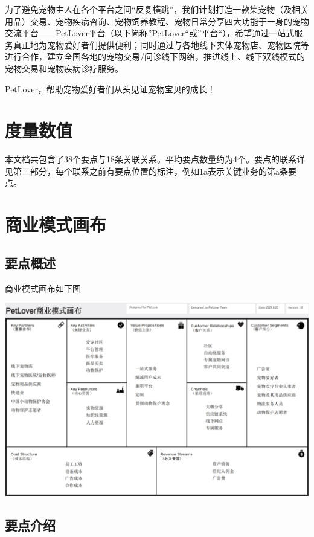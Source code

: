 \documentclass[a4paper]{ctexart}
\begin{document}
为了避免宠物主人在各个平台之间“反复横跳”，我们计划打造一款集宠物（及相关用品）交易、宠物疾病咨询、宠物饲养教程、宠物日常分享四大功能于一身的宠物交流平台——PetLover平台（以下简称”PetLover“或”平台“），希望通过一站式服务真正地为宠物爱好者们提供便利；同时通过与各地线下实体宠物店、宠物医院等进行合作，建立全国各地的宠物交易/问诊线下网络，推进线上、线下双线模式的宠物交易和宠物疾病诊疗服务。

PetLover，帮助宠物爱好者们从头见证宠物宝贝的成长！


\section{度量数值}

本文档共包含了38个要点与18条关联关系。平均要点数量约为4个。要点的联系详见第三部分，每个联系之前有要点位置的标注，例如1a表示关键业务的第a条要点。

\section{商业模式画布}

\subsection{要点概述}

商业模式画布如下图

\begin{center}
  \includegraphics[width=16cm]{the-business-model-canvas}
\end{center}

\subsection{要点介绍}
\end{document}

